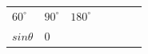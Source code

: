 {\begin{center}
\begin{xtabular*}{\mytablewidth}[t]{|p{10\mystarwidth}|p{10\mystarwidth}|p{10\mystarwidth}|p{10\mystarwidth}|p{10\mystarwidth}|p{10\mystarwidth}|p{10\mystarwidth}|}
    
        
                  \begin{math}{60}^{\circ }\end{math}
                 &
    
    
        
                  \begin{math}{90}^{\circ }\end{math}
                 &
    
    
        
                  \begin{math}{180}^{\circ }\end{math}
     \tabularnewline{}
    
    
        
                  \begin{math}sin\theta \end{math}
                 &
    
    
        0 &
    
    
        

\end{xtabular*}
\end{center}}
